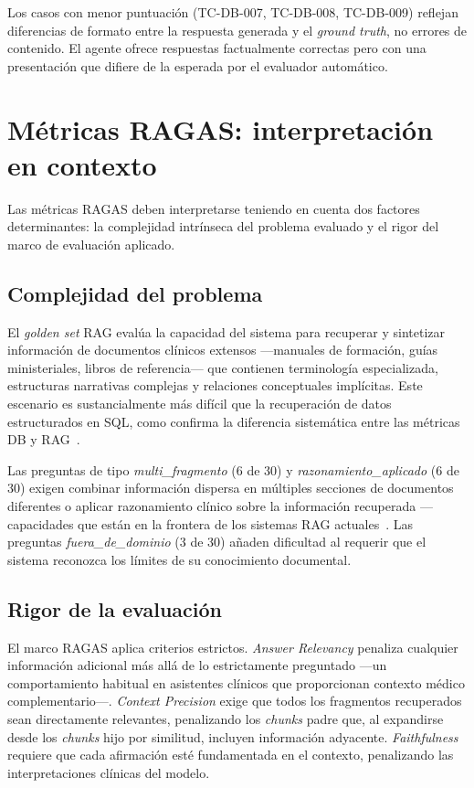 Los casos con menor puntuación (TC-DB-007, TC-DB-008, TC-DB-009) reflejan diferencias de formato entre la respuesta generada y el \textit{ground truth}, no errores de contenido. El agente ofrece respuestas factualmente correctas pero con una presentación que difiere de la esperada por el evaluador automático.


\section{Métricas \acs{RAGAS}: interpretación en contexto}

Las métricas \ac{RAGAS} deben interpretarse teniendo en cuenta dos factores determinantes: la complejidad intrínseca del problema evaluado y el rigor del marco de evaluación aplicado.

\subsection{Complejidad del problema}

El \textit{golden set} \ac{RAG} evalúa la capacidad del sistema para recuperar y sintetizar información de documentos clínicos extensos ---manuales de formación, guías ministeriales, libros de referencia--- que contienen terminología especializada, estructuras narrativas complejas y relaciones conceptuales implícitas. Este escenario es sustancialmente más difícil que la recuperación de datos estructurados en \ac{SQL}, como confirma la diferencia sistemática entre las métricas DB y \ac{RAG}~\parencite{xiong2024medrag}.

Las preguntas de tipo \textit{multi\_fragmento} (6 de 30) y \textit{razonamiento\_aplicado} (6 de 30) exigen combinar información dispersa en múltiples secciones de documentos diferentes o aplicar razonamiento clínico sobre la información recuperada ---capacidades que están en la frontera de los sistemas \ac{RAG} actuales~\parencite{Neha2025raghealth,Amugongo2025systematic}. Las preguntas \textit{fuera\_de\_dominio} (3 de 30) añaden dificultad al requerir que el sistema reconozca los límites de su conocimiento documental.

\subsection{Rigor de la evaluación}

El marco \ac{RAGAS} aplica criterios estrictos. \textit{Answer Relevancy} penaliza cualquier información adicional más allá de lo estrictamente preguntado ---un comportamiento habitual en asistentes clínicos que proporcionan contexto médico complementario---. \textit{Context Precision} exige que todos los fragmentos recuperados sean directamente relevantes, penalizando los \textit{chunks} padre que, al expandirse desde los \textit{chunks} hijo por similitud, incluyen información adyacente. \textit{Faithfulness} requiere que cada afirmación esté fundamentada en el contexto, penalizando las interpretaciones clínicas del modelo.

